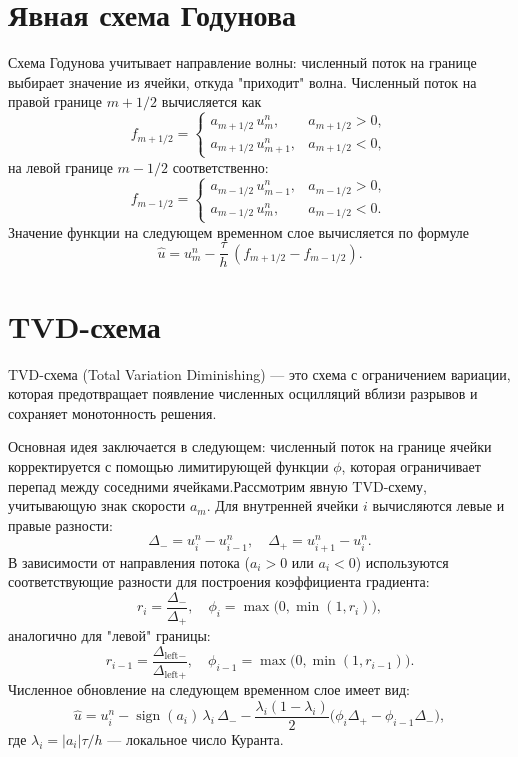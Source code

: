 \documentclass[a4paper,14pt]{extreport}
\begin{document}
\section*{Явная схема Годунова}
Схема Годунова учитывает направление волны: численный поток на границе выбирает значение из ячейки, откуда "приходит" волна.  
Численный поток на правой границе \(m+1/2\) вычисляется как
\[
f_{m+1/2} =
\begin{cases}
a_{m+1/2}\, u_m^n, & a_{m+1/2} > 0,\\[2mm]
a_{m+1/2}\, u_{m+1}^n, & a_{m+1/2} < 0,
\end{cases}
\]
на левой границе \(m-1/2\) соответственно:
\[
f_{m-1/2} =
\begin{cases}
a_{m-1/2}\, u_{m-1}^n, & a_{m-1/2} > 0,\\[2mm]
a_{m-1/2}\, u_m^n, & a_{m-1/2} < 0.
\end{cases}
\]
Значение функции на следующем временном слое вычисляется по формуле
\begin{equation}
\hat{u} = u_m^n - \frac{\tau}{h}\,(f_{m+1/2} - f_{m-1/2}).
\end{equation}

\section*{TVD-схема}

TVD-схема (Total Variation Diminishing) \cite{popov} — это схема с ограничением вариации, которая предотвращает появление численных осцилляций вблизи разрывов и сохраняет монотонность решения.

Основная идея заключается в следующем: численный поток на границе ячейки корректируется с помощью лимитирующей функции \(\phi\), которая ограничивает перепад между соседними ячейками.Рассмотрим явную TVD-схему, учитывающую знак скорости \(a_m\).  
Для внутренней ячейки \(i\) вычисляются левые и правые разности:
\[
\Delta_- = u_i^n - u_{i-1}^n, \quad
\Delta_+ = u_{i+1}^n - u_i^n.
\]
В зависимости от направления потока (\(a_i > 0\) или \(a_i < 0\)) используются соответствующие разности для построения коэффициента градиента:
\[
r_i = \frac{\Delta_-}{\Delta_+}, \quad 
\phi_i = \max\bigl(0, \min(1, r_i)\bigr),
\]
аналогично для "левой" границы:
\[
r_{i-1} = \frac{\Delta_{\text{left}-}}{\Delta_{\text{left}+}}, \quad 
\phi_{i-1} = \max\bigl(0, \min(1, r_{i-1})\bigr).
\]
Численное обновление на следующем временном слое имеет вид:
\begin{equation}
\hat{u} = u_i^n 
- \operatorname{sign}(a_i)\,\lambda_i \,\Delta_- 
- \frac{\lambda_i (1-\lambda_i)}{2} \bigl(\phi_i \Delta_+ - \phi_{i-1} \Delta_-\bigr),
\end{equation}
где \(\lambda_i = |a_i|\tau/h\) — локальное число Куранта.
\end{document}
